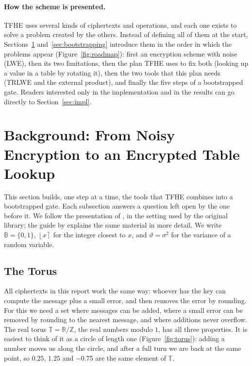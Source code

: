 \documentclass[12pt]{article}
\theoremstyle{plain}
\theoremstyle{definition}
\newcommand{\T}{\mathbb{T}}
\newcommand{\Z}{\mathbb{Z}}
\newcommand{\R}{\mathbb{R}}
\newcommand{\B}{\mathbb{B}}
\newcommand{\round}[1]{\left\lfloor #1 \right\rceil}
\begin{document}
\paragraph{How the scheme is presented.}
TFHE uses several kinds of ciphertexts and operations, and each one exists to
solve a problem created by the others. Instead of defining all of them at the
start, Sections~\ref{sec:background} and~\ref{sec:bootstrapping} introduce them
in the order in which the problems appear (Figure~\ref{fig:roadmap}): first an
encryption scheme with noise (LWE), then its two limitations, then the plan
TFHE uses to fix both (looking up a value in a table by rotating it), then the
two tools that this plan needs (TRLWE and the external product), and finally
the five steps of a bootstrapped gate. Readers interested only in the
implementation and in the results can go directly to Section~\ref{sec:impl}.



\section{Background: From Noisy Encryption to an Encrypted Table Lookup}
\label{sec:background}

This section builds, one step at a time, the tools that TFHE combines into a
bootstrapped gate. Each subsection answers a question left open by the one
before it. We follow the presentation of \cite{chillotti2020tfhe}, in the
setting used by the original library; the guide by \cite{joye2022guide}
explains the same material in more detail. We write $\B=\{0,1\}$, $\round{x}$
for the integer closest to $x$, and $\vartheta=\sigma^2$ for the variance of a
random variable.

\subsection{The Torus}
\label{sec:torus}

All ciphertexts in this report work the same way: whoever has the key can
compute the message plus a small error, and then removes the error by
rounding. For this we need a set where messages can be added, where a small
error can be removed by rounding to the nearest message, and where additions
never overflow. The real torus $\T=\R/\Z$, the real numbers modulo $1$, has all
three properties. It is easiest to think of it as a circle of length one
(Figure~\ref{fig:torus}): adding a number moves us along the circle, and after
a full turn we are back at the same point, so $0.25$, $1.25$ and $-0.75$ are the
same element of $\T$.
\end{document}
